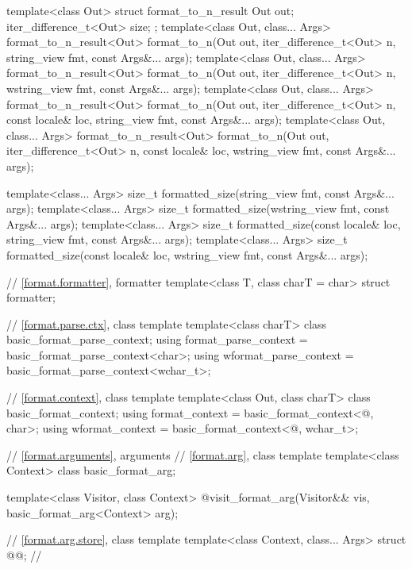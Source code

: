 \begin{codeblock}
{  template<class Out> struct format_to_n_result {
    Out out;
    iter_difference_t<Out> size;
  };
  template<class Out, class... Args>
    format_to_n_result<Out> format_to_n(Out out, iter_difference_t<Out> n,
                                        string_view fmt, const Args&... args);
  template<class Out, class... Args>
    format_to_n_result<Out> format_to_n(Out out, iter_difference_t<Out> n,
                                        wstring_view fmt, const Args&... args);
  template<class Out, class... Args>
    format_to_n_result<Out> format_to_n(Out out, iter_difference_t<Out> n,
                                        const locale& loc, string_view fmt,
                                        const Args&... args);
  template<class Out, class... Args>
    format_to_n_result<Out> format_to_n(Out out, iter_difference_t<Out> n,
                                        const locale& loc, wstring_view fmt,
                                        const Args&... args);

  template<class... Args>
    size_t formatted_size(string_view fmt, const Args&... args);
  template<class... Args>
    size_t formatted_size(wstring_view fmt, const Args&... args);
  template<class... Args>
    size_t formatted_size(const locale& loc, string_view fmt, const Args&... args);
  template<class... Args>
    size_t formatted_size(const locale& loc, wstring_view fmt, const Args&... args);

  // \ref{format.formatter}, formatter
  template<class T, class charT = char> struct formatter;

  // \ref{format.parse.ctx}, class template 
  template<class charT> class basic_format_parse_context;
  using format_parse_context = basic_format_parse_context<char>;
  using wformat_parse_context = basic_format_parse_context<wchar_t>;

  // \ref{format.context}, class template 
  template<class Out, class charT> class basic_format_context;
  using format_context = basic_format_context<@\unspec@, char>;
  using wformat_context = basic_format_context<@\unspec@, wchar_t>;

  // \ref{format.arguments}, arguments
  // \ref{format.arg}, class template 
  template<class Context> class basic_format_arg;

  template<class Visitor, class Context>
    @\seebelow@ visit_format_arg(Visitor&& vis, basic_format_arg<Context> arg);

  // \ref{format.arg.store}, class template 
  template<class Context, class... Args> struct @@;      // \expos

}
\end{codeblock}
